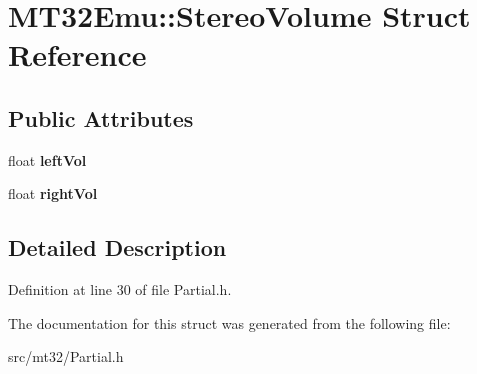\hypertarget{structMT32Emu_1_1StereoVolume}{\section{M\-T32\-Emu\-:\-:Stereo\-Volume Struct Reference}
\label{structMT32Emu_1_1StereoVolume}
}
\subsection*{Public Attributes}
\begin{DoxyCompactItemize}
\item 
\hypertarget{structMT32Emu_1_1StereoVolume_acd9da3d9c02de568db4f2081bdb3879b}{float {\bfseries left\-Vol}}\label{structMT32Emu_1_1StereoVolume_acd9da3d9c02de568db4f2081bdb3879b}

\item 
\hypertarget{structMT32Emu_1_1StereoVolume_af2c5a9555eae2294054761651570e264}{float {\bfseries right\-Vol}}\label{structMT32Emu_1_1StereoVolume_af2c5a9555eae2294054761651570e264}

\end{DoxyCompactItemize}


\subsection{Detailed Description}


Definition at line 30 of file Partial.\-h.



The documentation for this struct was generated from the following file\-:\begin{DoxyCompactItemize}
\item 
src/mt32/Partial.\-h\end{DoxyCompactItemize}
